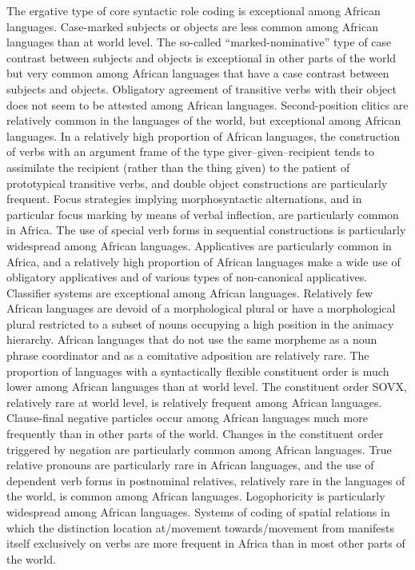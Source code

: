 \documentclass[output=paper,hidelinks]{langscibook}
\begin{document}
\ea\label{ex:African:2}
\ea The ergative type of core syntactic role coding is exceptional among African languages. 
\ex Case-marked subjects or objects are less common among African languages than at world level. 
\ex The so-called “marked-nominative” type of case contrast between subjects and objects is exceptional in other parts of the world but very common among African languages that have a case contrast between subjects and objects. 
\ex Obligatory agreement of transitive verbs with their object does not seem to be attested among African languages. 
\ex Second-position clitics are relatively common in the languages of the world, but exceptional among African languages. 
\ex In a relatively high proportion of African languages, the construction of verbs with an argument frame of the type giver–given–recipient tends to assimilate the recipient (rather than the thing given) to the patient of prototypical transitive verbs, and double object constructions are particularly frequent. 
\ex Focus strategies implying morphosyntactic alternations, and in particular focus marking by means of verbal inflection, are particularly common in Africa. 
\ex The use of special verb forms in sequential constructions is particularly widespread among African languages. 
\ex Applicatives are particularly common in Africa, and a relatively high proportion of African languages make a wide use of obligatory applicatives and of various types of non-canonical applicatives.
\ex Classifier systems are exceptional among African languages. 
\ex Relatively few African languages are devoid of a morphological plural or have a morphological plural restricted to a subset of nouns occupying a high position in the animacy hierarchy. 
\ex African languages that do not use the same morpheme as a noun phrase coordinator and as a comitative adposition are relatively rare. 
\ex The proportion of languages with a syntactically flexible constituent order is much lower among African languages than at world level.
\ex The constituent order SOVX, relatively rare at world level, is relatively frequent among African languages.
\ex Clause-final negative particles occur among African languages much more frequently than in other parts of the world. 
\ex Changes in the constituent order triggered by negation are particularly common among African languages. 
\ex True relative pronouns are particularly rare in African languages, and the use of dependent verb forms in postnominal relatives, relatively rare in the languages of the world, is common among African languages. 
\ex Logophoricity is particularly widespread among African languages. 
\ex Systems of coding of spatial relations in which the distinction location at/movement towards/movement from manifests itself exclusively on verbs are more frequent in Africa than in most other parts of the world.
\z
\z
\end{document}
